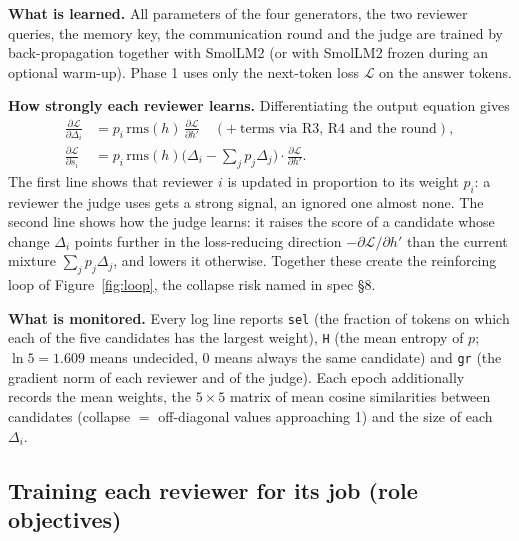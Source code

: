 \documentclass[a4paper,12pt,parskip=half,headsepline]{scrartcl}
\newcommand{\code}[1]{\texttt{\small #1}}
\begin{document}
\begin{tech}
\textbf{What is learned.} All parameters of the four generators, the two reviewer
queries, the memory key, the communication round and the judge are trained by
back-propagation together with SmolLM2 (or with SmolLM2 frozen during an optional
warm-up). Phase 1 uses only the next-token loss $\mathcal L$ on the answer tokens.

\textbf{How strongly each reviewer learns.} Differentiating the output equation gives
\begin{align*}
\frac{\partial\mathcal L}{\partial \Delta_i} &= p_i\,\text{rms}(h)\,\frac{\partial\mathcal L}{\partial h'}\quad (+\ \text{terms via R3, R4 and the round}),\\
\frac{\partial\mathcal L}{\partial s_i} &= p_i\,\text{rms}(h)\Big(\Delta_i - \textstyle\sum_j p_j\Delta_j\Big)\cdot\frac{\partial\mathcal L}{\partial h'} .
\end{align*}
The first line shows that reviewer $i$ is updated in proportion to its weight $p_i$: a
reviewer the judge uses gets a strong signal, an ignored one almost none. The second line
shows how the judge learns: it raises the score of a candidate whose change
$\Delta_i$ points further in the loss-reducing direction $-\partial\mathcal L/\partial h'$
than the current mixture $\sum_j p_j\Delta_j$, and lowers it otherwise. Together these
create the reinforcing loop of Figure~\ref{fig:loop}, the collapse risk named in spec \S8.

\textbf{What is monitored.} Every log line reports \code{sel} (the fraction of tokens on
which each of the five candidates has the largest weight), \code{H} (the mean entropy of
$p$; $\ln 5 = 1.609$ means undecided, $0$ means always the same candidate) and \code{gr}
(the gradient norm of each reviewer and of the judge). Each epoch additionally records
the mean weights, the $5\times5$ matrix of mean cosine similarities between candidates
(collapse $=$ off-diagonal values approaching 1) and the size of each $\Delta_i$.
\end{tech}

\subsection{Training each reviewer for its job (role objectives)}
\end{document}
